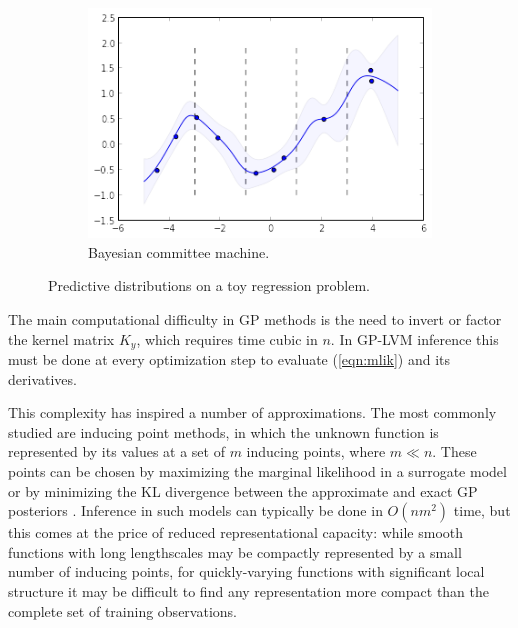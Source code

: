 \documentclass{article}
\begin{document}
\begin{figure}
\begin{subfigure}[t]{.30\textwidth}
  \includegraphics[width=\textwidth]{toy_bcm_posterior}
  \caption{Bayesian committee machine.}
  \label{fig:bcm}
\end{subfigure}
\caption{Predictive distributions on a toy regression problem.}
\label{fig:approx}
\end{figure} 


The main computational difficulty in GP methods is
the need to invert or factor the kernel matrix $K_y$, which requires time cubic
in $n$. In GP-LVM inference this must be done at every optimization step to evaluate
(\ref{eqn:mlik}) and its derivatives.

This complexity has inspired
a number of approximations. The most commonly studied are inducing
point methods, in which the unknown function is
represented by its values at a set of $m$ inducing
points, where $m \ll n$. These points can be chosen by maximizing the marginal
likelihood in a surrogate model \citep{quinonero2005, lawrence2007learning} or by
minimizing the KL divergence between the approximate and exact GP posteriors
\citep{titsias2009variational}. Inference in such models can
typically be done in $O(nm^2)$ time, but this comes at the price
of reduced representational capacity: while smooth functions with long lengthscales may
be compactly represented by a small number of inducing points, for
quickly-varying functions with significant local
structure it may be difficult to find any representation more compact
than the complete set of training observations.
\end{document}
